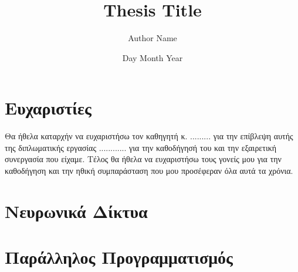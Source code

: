 \documentclass[12pt,twoside]{book}
\title{Thesis Title}
\author{Author Name}
\date{Day Month Year}
\newcommand{\en}[1]{\foreignlanguage{english}{#1}}
\begin{document}


\frontmatter





\chapter*{\centering \large Ευχαριστίες}

Θα ήθελα καταρχήν να ευχαριστήσω τον καθηγητή κ. .........
για την επίβλεψη αυτής της διπλωματικής εργασίας 
............ για την καθοδήγησή του και την εξαιρετική συνεργασία που είχαμε. Τέλος θα ήθελα να ευχαριστήσω τους γονείς μου για την καθοδήγηση και την ηθική συμπαράσταση που μου προσέφεραν όλα αυτά τα χρόνια.

\tableofcontents
{}%

\listoffigures

\listoftables

\mainmatter


\chapter{Νευρωνικά Δίκτυα}


\chapter{Παράλληλος Προγραμματισμός}

\end{document}
